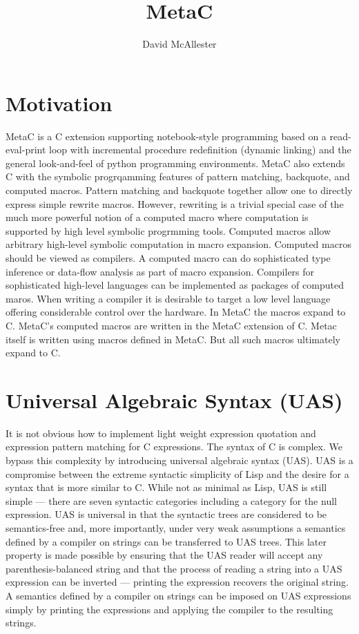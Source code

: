 \documentclass{article}
\title{MetaC}
\author{David McAllester}
\begin{document}
\maketitle

\section{Motivation}

\bigskip
\bigskip
MetaC is a C extension supporting notebook-style programming based on a read-eval-print loop with incremental procedure redefinition (dynamic linking) and the general look-and-feel of
python programming environments.  MetaC also extends C with the symbolic progrqamming features of pattern matching, backquote, and computed macros.
Pattern matching and backquote together allow one to directly express simple rewrite macros. However, rewriting is a trivial special case of the much more powerful notion
of a computed macro where computation is supported by high level symbolic progrmming tools.
Computed macros allow arbitrary high-level symbolic computation in macro expansion. Computed macros should be viewed as compilers.  A computed macro can do
sophisticated type inference or data-flow analysis as part of macro expansion.
Compilers for sophisticated high-level languages can be implemented as packages of computed maros.
When writing a compiler it is desirable to target a low level language offering considerable control over the hardware.  In MetaC the macros
expand to C.  MetaC's computed macros are written in the MetaC extension of C.  Metac itself is written using macros defined in MetaC.  But all such macros ultimately expand to
C.

\section{Universal Algebraic Syntax (UAS)}

It is not obvious how to implement light weight expression quotation and expression pattern matching for C expressions.  The syntax of C is complex.  We bypass this complexity by introducing universal algebraic syntax (UAS).
UAS is a compromise between the extreme syntactic simplicity of Lisp and the desire for a syntax that is more similar to C.
While not as minimal as Lisp, UAS is still simple --- there are seven syntactic categories including a category for the null expression.
UAS is universal in that the syntactic trees are considered to be semantics-free and, more importantly, under very weak assumptions a semantics defined by a compiler on strings
can be transferred to UAS trees.
This later property is made possible by ensuring that the UAS reader will accept any parenthesis-balanced string
and that the process of reading a string into a UAS expression can be inverted --- printing the expression recovers the original string.
A semantics defined by a compiler on strings can be imposed on UAS expressions simply by printing the expressions and applying the compiler to the resulting strings.
\end{document}
